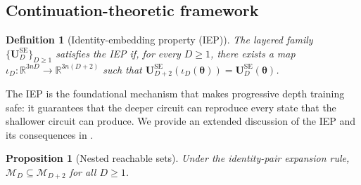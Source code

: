 \documentclass[11pt]{article}
\newcommand{\cM}{\mathcal{M}}
\newcommand{\bbR}{\mathbb{R}}
\newtheorem{proposition}[theorem]{Proposition}
\theoremstyle{plain}
\newtheorem{definition}[theorem]{Definition}
\theoremstyle{plain}
\begin{document}
\subsection{Continuation-theoretic framework}
\label{sec:continuation}
\begin{definition}[Identity-embedding property (IEP)]
\label{def:iep}
  The layered family $\{\mathbf{U}_D^{\mathrm{SE}}\}_{D\ge 1}$ satisfies the
  IEP if, for every $D\ge 1$, there exists a map
  $\iota_D:\bbR^{3nD}\to\bbR^{3n(D+2)}$ such that
  $\mathbf{U}_{D+2}^{\mathrm{SE}}(\iota_D(\bm\theta))
  = \mathbf{U}_D^{\mathrm{SE}}(\bm\theta)$.
\end{definition}
The IEP is the foundational mechanism that makes progressive depth
training safe: it guarantees that the deeper circuit can reproduce
every state that the shallower circuit can produce.  We provide an
extended discussion of the IEP and its consequences in
.
\begin{proposition}[Nested reachable sets]\label{prop:nested}
  Under the identity-pair expansion rule,
  $\cM_D\subseteq\cM_{D+2}$ for all $D\ge 1$.
\end{proposition}
\end{document}
